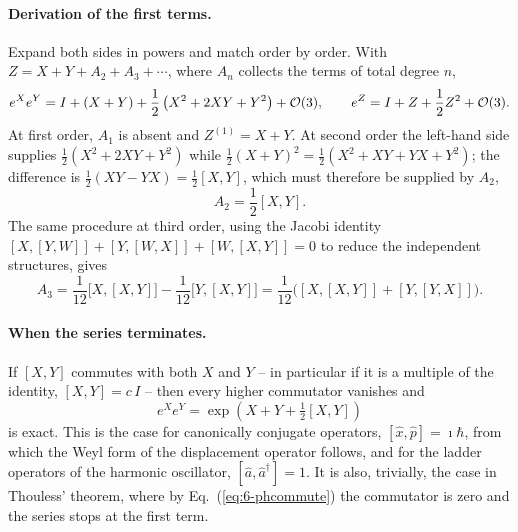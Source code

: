 \paragraph{Derivation of the first terms.}
Expand both sides in powers and match order by order.  With
$Z=X+Y+A_2+A_3+\cdots$, where $A_n$ collects the terms of total degree $n$,
\begin{equation}
  e^{X}e^{Y} = I + (X+Y)
    + \frac{1}{2}\left(X^2+2XY+Y^2\right)
    + \mathcal{O}(3),
  \qquad
  e^{Z} = I + Z + \frac{1}{2}Z^2 + \mathcal{O}(3).
  \label{eq:6-bchmatch}
\end{equation}
At first order, $A_1$ is absent and $Z^{(1)}=X+Y$.  At second order the
left-hand side supplies $\tfrac12(X^2+2XY+Y^2)$ while
$\tfrac12(X+Y)^2=\tfrac12(X^2+XY+YX+Y^2)$; the difference is
$\tfrac12(XY-YX)=\tfrac12[X,Y]$, which must therefore be supplied by $A_2$,
\begin{equation}
  A_2 = \frac{1}{2}[X,Y].
  \label{eq:6-bchA2}
\end{equation}
The same procedure at third order, using the Jacobi identity
$[X,[Y,W]]+[Y,[W,X]]+[W,[X,Y]]=0$ to reduce the independent structures, gives
\begin{equation}
  A_3 = \frac{1}{12}\big[X,[X,Y]\big] - \frac{1}{12}\big[Y,[X,Y]\big]
      = \frac{1}{12}\Big([X,[X,Y]] + [Y,[Y,X]]\Big).
  \label{eq:6-bchA3}
\end{equation}

\paragraph{When the series terminates.}
If $[X,Y]$ commutes with both $X$ and $Y$ -- in particular if it is a multiple
of the identity, $[X,Y]=c\,I$ -- then every higher commutator vanishes and
\begin{equation}
  e^{X}e^{Y} = \exp\left(X+Y+\tfrac12[X,Y]\right)
  \label{eq:6-bchcentral}
\end{equation}
is exact.  This is the case for canonically conjugate operators,
$[\hat{x},\hat{p}]=\imath\hbar$, from which the Weyl form of the
displacement operator follows, and for the ladder operators of the harmonic
oscillator, $[\hat{a},\hat{a}^{\dagger}]=1$.  It is also, trivially, the case
in Thouless' theorem, where by Eq.~(\ref{eq:6-phcommute}) the commutator is
zero and the series stops at the first term.

